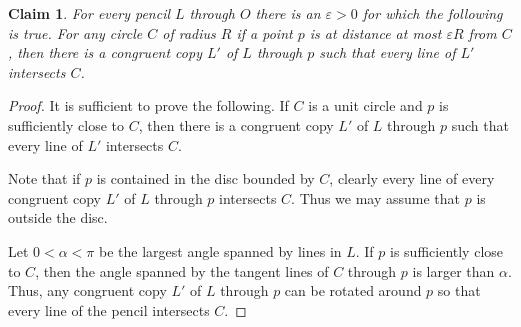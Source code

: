 \documentclass[12pt]{article}
\theoremstyle{plain}
\newtheorem{claim}[theorem]{Claim}
\theoremstyle{definition}
\begin{document}
\begin{claim}\label{gyuru} For every pencil $L$ through $O$ there is an $\varepsilon> 0$ for which the following is true. For any circle $C$ of radius $R$ if a point $p$ is at distance at most $\varepsilon R$ from $C$, then there is a congruent copy $L'$ of $L$ through $p$ such that every line of $L'$ intersects $C$.
\end{claim}

\begin{proof} It is sufficient to prove the following. If $C$ is a unit circle and $p$ is sufficiently close to $C$, then there is a congruent copy $L'$ of $L$ through $p$ such that every line of $L'$ intersects $C$.

Note that if $p$ is contained in the disc bounded by $C$, clearly every line of every congruent copy $L'$ of $L$ through $p$ intersects $C$. Thus we may assume that $p$ is outside the disc. 

Let $0<\alpha<\pi$ be the largest angle spanned by lines in $L$. If $p$ is sufficiently close to $C$, then the angle spanned by the tangent lines of $C$ through $p$ is larger than $\alpha$. Thus, any congruent copy $L'$ of $L$ through $p$ can be rotated around $p$ so that every line of the pencil intersects $C$.
\end{proof} 
\end{document}
